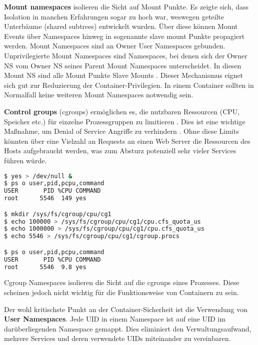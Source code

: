 \textbf{Mount namespaces} isolieren die Sicht auf Mount Punkte. Es zeigte sich, dass Isolation in manchen Erfahrungen sogar zu hoch war, weswegen geteilte Unterbäume (shared subtrees) entwickelt wurden. Über diese können Mount Events über Namespaces hinweg in sogenannte slave mount Punkte propagiert werden. Mount Namespaces sind an Owner User Namespaces gebunden. Unprivilegierte Mount Namespaces sind Namespaces, bei denen sich der Owner NS vom Owner NS seines Parent Mount Namespaces
unterscheidet. In diesen Mount NS sind alle Mount Punkte Slave Mounts \cite{man-mount-ns}. Dieser Mechanismus eignet sich gut zur Reduzierung der Container-Privilegien. In einem Container sollten in Normalfall keine weiteren Mount Namespaces notwendig sein.

\textbf{Control groups} (cgroups) ermöglichen es, die nutzbaren Ressourcen (CPU, Speicher etc.) für einzelne Prozessgruppen zu limitieren \cite{man-cgroups}. Dies ist eine wichtige Maßnahme, um Denial of Service Angriffe zu verhindern \cite{lxc-sec}. Ohne diese Limits könnten über eine Vielzahl an Requests an einen Web Server die Ressourcen des Hosts aufgebraucht werden, was zum Absturz potenziell sehr vieler Services führen würde.

\begin{lstlisting}[language=sh,caption={Ressourcenlimitierung einer DoS-Attacke (durch \texttt{yes} mimiert) mithilfe von cgroups}]
$ yes > /dev/null &
$ ps o user,pid,pcpu,command
USER       PID %CPU COMMAND
root      5546  149 yes

$ mkdir /sys/fs/cgroup/cpu/cg1
$ echo 100000 > /sys/fs/cgroup/cpu/cg1/cpu.cfs_quota_us
$ echo 1000000 > /sys/fs/cgroup/cpu/cg1/cpu.cfs_quota_us
$ echo 5546 > /sys/fs/cgroup/cpu/cg1/cgroup.procs

$ ps o user,pid,pcpu,command
USER       PID %CPU COMMAND
root      5546  9.8 yes
\end{lstlisting}

Cgroup Namespaces isolieren die Sicht auf die cgroups eines Prozesses. Diese scheinen jedoch nicht wichtig für die Funktionsweise von Containern zu sein.

Der wohl kritischste Punkt an der Container-Sicherheit ist die Verwendung von \textbf{User Namespaces}. Jede UID in einem Namespace ist auf eine UID im darüberliegenden Namespace gemappt. Dies eliminiert den Verwaltungsaufwand, mehrere Services und deren verwendete UIDs miteinander zu vereinbaren.

